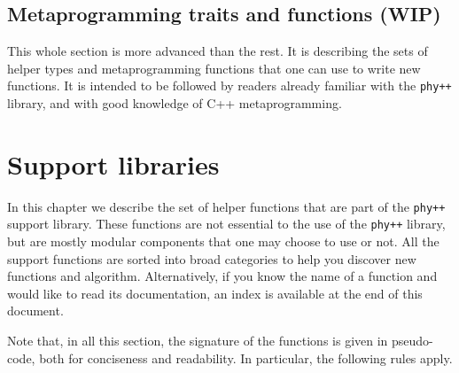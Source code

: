 \documentclass[12pt]{report}
\newcommand{\phypp}{\texttt{phy++}\xspace}
\newenvironment{warning}
{
    \begin{mdframed}[style=warning,frametitle={Warning}]
}
{
    \end{mdframed}
}
\begin{document}
\section{Metaprogramming traits and functions (WIP) \label{SEC:core:meta}}

\begin{warning}
This whole section is more advanced than the rest. It is describing the sets of helper types and metaprogramming functions that one can use to write new functions. It is intended to be followed by readers already familiar with the \phypp library, and with good knowledge of C++ metaprogramming.
\end{warning}






\chapter{Support libraries \label{SEC:support}}

In this chapter we describe the set of helper functions that are part of the \phypp support library. These functions are not essential to the use of the \phypp library, but are mostly modular components that one may choose to use or not. All the support functions are sorted into broad categories to help you discover new functions and algorithm. Alternatively, if you know the name of a function and would like to read its documentation, an index is available at the end of this document.

Note that, in all this section, the signature of the functions is given in pseudo-code, both for conciseness and readability. In particular, the following rules apply.
\end{document}
